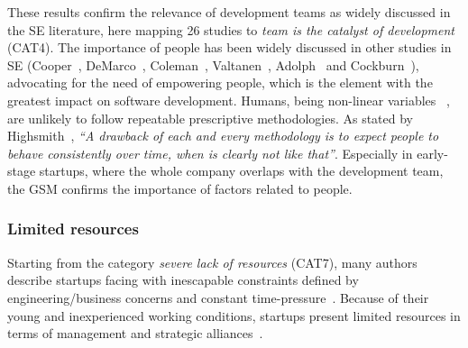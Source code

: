\documentclass[10pt,journal,letterpaper,compsoc]{IEEEtran}
\begin{document}
These results confirm the relevance of development teams as widely discussed in
the SE literature, here mapping 26 studies to \textit{team is the catalyst of
development} (CAT4). The importance of people has been widely discussed in other
studies in SE (Cooper~\cite{Cooper1986}, DeMarco~\cite{peopleware-demarco1999},
Coleman~\cite{Coleman2004}, Valtanen~\cite{Valtanen2008}, 
Adolph~\cite{Adolph2011} and Cockburn~\cite{people-first-order}), advocating for 
the need of empowering people, which is the element with the greatest impact on
software development. Humans, being non-linear variables~\cite{Human}
, are unlikely to follow repeatable prescriptive methodologies. As
stated by Highsmith~\cite{Highsmith2000}, \textit{``A drawback of each and
every methodology is to expect people to behave consistently over time, when is
clearly not like that''}. Especially in early-stage startups, where the whole
company overlaps with the development team, the GSM confirms the importance of
factors related to people.


\subsubsection{Limited resources}

Starting from the category \textit{severe lack of resources} (CAT7), many
authors describe startups facing with inescapable constraints defined by
engineering/business concerns and constant time-pressure~\cite{Camel1994a,
Cugola98softwareprocesses:}. Because of their young and inexperienced working
conditions, startups present limited resources in terms of management and
strategic alliances~\cite{Sutton2000}.
\end{document}

